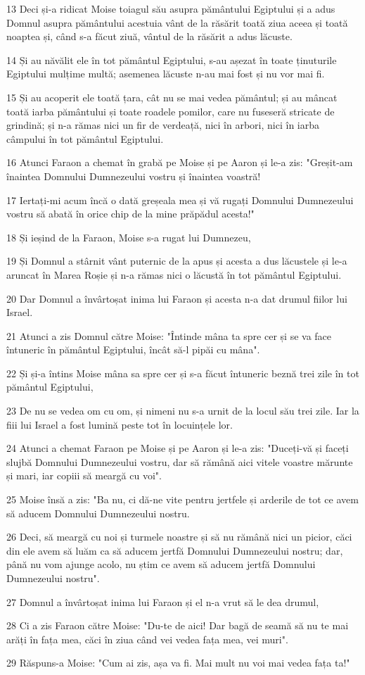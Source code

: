 \par 13 Deci și-a ridicat Moise toiagul său asupra pământului Egiptului și a adus Domnul asupra pământului acestuia vânt de la răsărit toată ziua aceea și toată noaptea și, când s-a făcut ziuă, vântul de la răsărit a adus lăcuste.
\par 14 Și au năvălit ele în tot pământul Egiptului, s-au așezat în toate ținuturile Egiptului mulțime multă; asemenea lăcuste n-au mai fost și nu vor mai fi.
\par 15 Și au acoperit ele toată țara, cât nu se mai vedea pământul; și au mâncat toată iarba pământului și toate roadele pomilor, care nu fuseseră stricate de grindină; și n-a rămas nici un fir de verdeață, nici în arbori, nici în iarba câmpului în tot pământul Egiptului.
\par 16 Atunci Faraon a chemat în grabă pe Moise și pe Aaron și le-a zis: "Greșit-am înaintea Domnului Dumnezeului vostru și înaintea voastră!
\par 17 Iertați-mi acum încă o dată greșeala mea și vă rugați Domnului Dumnezeului vostru să abată în orice chip de la mine prăpădul acesta!"
\par 18 Și ieșind de la Faraon, Moise s-a rugat lui Dumnezeu,
\par 19 Și Domnul a stârnit vânt puternic de la apus și acesta a dus lăcustele și le-a aruncat în Marea Roșie și n-a rămas nici o lăcustă în tot pământul Egiptului.
\par 20 Dar Domnul a învârtoșat inima lui Faraon și acesta n-a dat drumul fiilor lui Israel.
\par 21 Atunci a zis Domnul către Moise: "Întinde mâna ta spre cer și se va face întuneric în pământul Egiptului, încât să-l pipăi cu mâna".
\par 22 Și și-a întins Moise mâna sa spre cer și s-a făcut întuneric beznă trei zile în tot pământul Egiptului,
\par 23 De nu se vedea om cu om, și nimeni nu s-a urnit de la locul său trei zile. Iar la fiii lui Israel a fost lumină peste tot în locuințele lor.
\par 24 Atunci a chemat Faraon pe Moise și pe Aaron și le-a zis: "Duceți-vă și faceți slujbă Domnului Dumnezeului vostru, dar să rămână aici vitele voastre mărunte și mari, iar copiii să meargă cu voi".
\par 25 Moise însă a zis: "Ba nu, ci dă-ne vite pentru jertfele și arderile de tot ce avem să aducem Domnului Dumnezeului nostru.
\par 26 Deci, să meargă cu noi și turmele noastre și să nu rămână nici un picior, căci din ele avem să luăm ca să aducem jertfă Domnului Dumnezeului nostru; dar, până nu vom ajunge acolo, nu știm ce avem să aducem jertfă Domnului Dumnezeului nostru".
\par 27 Domnul a învârtoșat inima lui Faraon și el n-a vrut să le dea drumul,
\par 28 Ci a zis Faraon către Moise: "Du-te de aici! Dar bagă de seamă să nu te mai arăți în fața mea, căci în ziua când vei vedea fața mea, vei muri".
\par 29 Răspuns-a Moise: "Cum ai zis, așa va fi. Mai mult nu voi mai vedea fața ta!"

